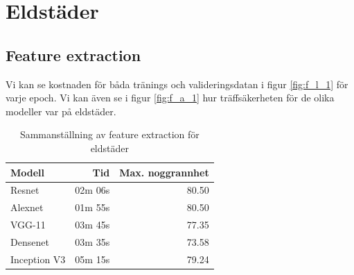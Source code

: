 \documentclass[]{kththesis}
\begin{document}
\section{Eldstäder}

\subsection{Feature extraction}
Vi kan se kostnaden för båda tränings och valideringsdatan i figur \ref{fig:f_l_1} för varje epoch. Vi kan även se i figur \ref{fig:f_a_1} hur träffsäkerheten för de olika modeller var på eldstäder.

\begin{table}
  \centering
  \begin{tabular}{|l|r|r|}
    Modell & Tid & Max. noggrannhet \\ 
    \hline
    Resnet       & 02m 06s & 80.50 \\
    Alexnet      & 01m 55s & 80.50 \\
    VGG-11       & 03m 45s & 77.35 \\
    Densenet     & 03m 35s & 73.58 \\
    Inception V3 & 05m 15s & 79.24 \\
  \end{tabular}
  \caption{Sammanställning av feature extraction för eldstäder}
\end{table}
\end{document}
